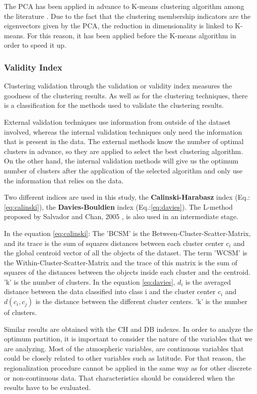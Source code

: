 The PCA has been applied in advance to K-means clustering algorithm among the literature \cite*{Ding2004}. Due to the fact that the clustering membership indicators are the eigenvectors given by the PCA, the reduction in dimensionality is linked to K-means. For this reason, it has been applied before the K-means algorithm in order to speed it up.

\subsubsection{Validity Index}

Clustering validation through the validation or validity index measures the goodness of the clustering results. As well as for the clustering techniques, there is a classification for the methods used to validate the clustering results.

External validation techniques use information from outside of the dataset involved, whereas the internal validation techniques only need the information that is present in the data. The external methods know the number of optimal clusters in advance, so they are applied to select the best clustering algorithm. On the other hand, the internal validation methods will give us the optimum number of clusters after the application of the selected algorithm and only use the information that relies on the data.

Two different indices are used in this study, the \textbf{Calinski-Harabasz} index (Eq.:\ref{eq:calinski}), the \textbf{Davies-Bouldien} index (Eq.:\ref{eq:davies}). The L-method proposed by Salvador and Chan, 2005 \cite*{CalinskiH, davies1979cluster, Salvador2004}, is also used in an intermediate stage.

In the equation \ref{eq:calinski}: The 'BCSM' is the Between-Cluster-Scatter-Matrix, and its trace is the sum of squares distances between each cluster center $c_{i}$ and the global centroid vector of all the objects of the dataset. The term 'WCSM' is the Within-Cluster-Scatter-Matrix and the trace of this matrix is the sum of squares of the distances between the objects inside each cluster and the centroid. 'k' is the number of clusters. In the equation \ref{eq:davies}, $d_{i}$ is the averaged distance between the data classified into class i and the cluster center $c_{i}$ and $d(c_i,c_j)$ is the distance between the different cluster centers. 'k' is the number of clusters. 

Similar results are obtained with the CH and DB indexes. In order to analyze the optimum partition, it is important to consider the nature of the variables that we are analyzing. Most of the atmospheric variables, are continuous variables that could be closely related to other variables such as latitude. For that reason, the regionalization procedure cannot be applied in the same way as for other discrete or non-continuous data. That characteristics should be considered when the results have to be evaluated.

